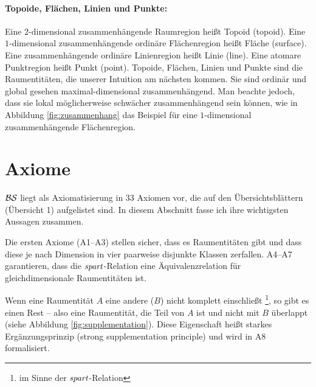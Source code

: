     \paragraph{Topoide, Flächen, Linien und Punkte:}
        Eine
        $2$-dimensional zusammenhängende Raumregion heißt Topoid (topoid).
        Eine $1$-di\-men\-sional zusammenhängende ordinäre Flächenregion heißt Fläche (surface).
        Eine zusammenhängende ordinäre Linienregion heißt Linie (line).
        Eine atomare %
        Punktregion heißt Punkt (point).
        Topoide, Flächen, Linien und Punkte sind die Raumentitäten, die unserer Intuition am nächsten kommen.
        Sie sind ordinär
        und global gesehen maximal-dimensional zusammenhängend.
        Man beachte jedoch, dass sie lokal möglicherweise schwächer zusammenhängend sein können, wie in Abbildung \ref{fig:zusammenhang} das Beispiel für eine $1$-dimensional zusammenhängende Flächenregion.


\section{Axiome}\label{ssec:axiome}
$\mathcal{BS}$ liegt als Axiomatisierung in 33 Axiomen vor, die auf den Übersichtsblättern (Übersicht 1) aufgelistet sind.
In diesem Abschnitt fasse ich ihre wichtigsten Aussagen zusammen.

Die
ersten Axiome (A1--A3) stellen sicher, dass es Raumentitäten gibt und dass diese je nach Dimension in vier paarweise disjunkte Klassen zerfallen.
A4--A7
garantieren, dass die $\mathit{spart}$-Relation eine Äquivalenzrelation für gleichdimensionale Raumentitäten ist.


Wenn
eine Raumentität $A$ eine andere ($B$) nicht komplett einschließt%
\footnote{im Sinne der $\mathit{spart}$-Relation},
so gibt es einen Rest -- also eine Raumentität, die Teil von $A$ ist und nicht mit $B$ überlappt (siehe Abbildung \ref{fig:supplementation}).
Diese Eigenschaft heißt starkes Ergänzungsprinzip (strong supplementation principle) und wird in A8 formalisiert.

